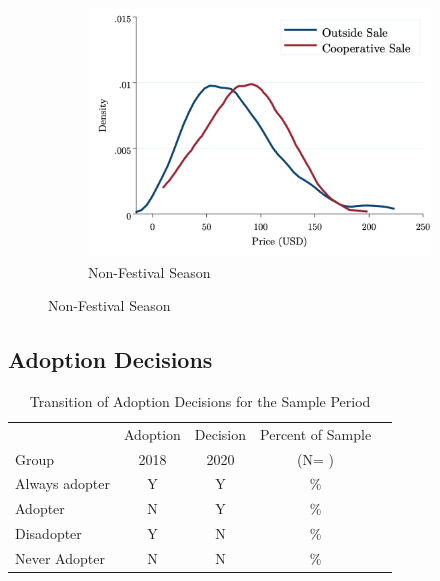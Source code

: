 \documentclass[11pt]{article}
\begin{document}
\begin{figure}[H]
\begin{subfigure}[t]{0.49\textwidth}
    \end{subfigure}
    \hfill
    \begin{subfigure}[t]{0.49\textwidth}
        \centering
        \caption{Non-Festival Season} \label{figure:E2_PD_NonFest}
        \includegraphics[width=\linewidth,trim=4 4 4 4,clip]{E2_PriceDensity_NonFest.png} 
    \end{subfigure}
\end{figure}


\subsection{Adoption Decisions}

\singlespacing
\begin{center}
\begin{table}[H]
\caption{Transition of Adoption Decisions for the Sample Period} 
\centering
\begin{tabular}{lcccc}
\noalign{\smallskip} \hline \noalign{\smallskip}
 & Adoption & \hspace{-.35cm} Decision & Percent of Sample \\
\noalign{\smallskip} \cline{2-3} \noalign{\smallskip} Group & 2018 & 2020 & (N= ) \\
\noalign{\smallskip} \hline \noalign{\smallskip}
Always adopter & Y & Y & \%  \\ 
Adopter & N & Y & \%  \\
Disadopter & Y & N & \%  \\
Never Adopter & N & N & \%  \\
\hline
\end{tabular}\\
\end{table}
\end{center}
\doublespacing
\end{document}
